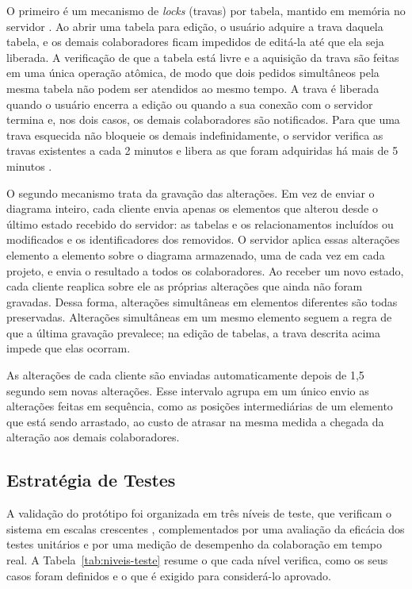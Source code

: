 O primeiro é um mecanismo de \textit{locks} (travas) por tabela, mantido em memória no servidor \cite{Hipolito2024}. Ao abrir uma tabela para edição, o usuário adquire a trava daquela tabela, e os demais colaboradores ficam impedidos de editá-la até que ela seja liberada. A verificação de que a tabela está livre e a aquisição da trava são feitas em uma única operação atômica, de modo que dois pedidos simultâneos pela mesma tabela não podem ser atendidos ao mesmo tempo. A trava é liberada quando o usuário encerra a edição ou quando a sua conexão com o servidor termina e, nos dois casos, os demais colaboradores são notificados. Para que uma trava esquecida não bloqueie os demais indefinidamente, o servidor verifica as travas existentes a cada 2 minutos e libera as que foram adquiridas há mais de 5 minutos \cite{Filippo2005}.

O segundo mecanismo trata da gravação das alterações. Em vez de enviar o diagrama inteiro, cada cliente envia apenas os elementos que alterou desde o último estado recebido do servidor: as tabelas e os relacionamentos incluídos ou modificados e os identificadores dos removidos. O servidor aplica essas alterações elemento a elemento sobre o diagrama armazenado, uma de cada vez em cada projeto, e envia o resultado a todos os colaboradores. Ao receber um novo estado, cada cliente reaplica sobre ele as próprias alterações que ainda não foram gravadas. Dessa forma, alterações simultâneas em elementos diferentes são todas preservadas. Alterações simultâneas em um mesmo elemento seguem a regra de que a última gravação prevalece; na edição de tabelas, a trava descrita acima impede que elas ocorram.

As alterações de cada cliente são enviadas automaticamente depois de 1,5 segundo sem novas alterações. Esse intervalo agrupa em um único envio as alterações feitas em sequência, como as posições intermediárias de um elemento que está sendo arrastado, ao custo de atrasar na mesma medida a chegada da alteração aos demais colaboradores.

\subsection[Estratégia de Testes]{Estratégia de Testes}
\label{subsec:estrategia-testes}
A validação do protótipo foi organizada em três níveis de teste, que verificam o sistema em escalas crescentes \cite{EngenhariaSoftware2021}, complementados por uma avaliação da eficácia dos testes unitários e por uma medição de desempenho da colaboração em tempo real. A Tabela~\ref{tab:niveis-teste} resume o que cada nível verifica, como os seus casos foram definidos e o que é exigido para considerá-lo aprovado.

